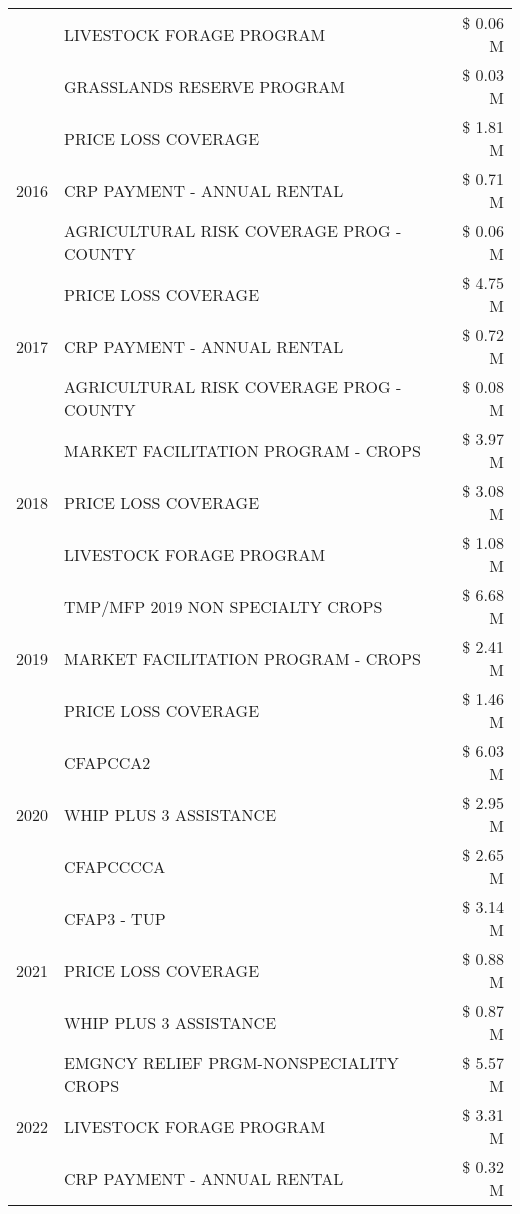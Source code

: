 \begin{tabular}{llr}
 & LIVESTOCK FORAGE PROGRAM & \$ 0.06 M \\
 & GRASSLANDS RESERVE PROGRAM & \$ 0.03 M \\
\cline{1-3}
\multirow[t]{3}{*}{2016} & PRICE LOSS COVERAGE & \$ 1.81 M \\
 & CRP PAYMENT - ANNUAL RENTAL & \$ 0.71 M \\
 & AGRICULTURAL RISK COVERAGE PROG - COUNTY & \$ 0.06 M \\
\cline{1-3}
\multirow[t]{3}{*}{2017} & PRICE LOSS COVERAGE & \$ 4.75 M \\
 & CRP PAYMENT - ANNUAL RENTAL & \$ 0.72 M \\
 & AGRICULTURAL RISK COVERAGE PROG - COUNTY & \$ 0.08 M \\
\cline{1-3}
\multirow[t]{3}{*}{2018} & MARKET FACILITATION PROGRAM - CROPS & \$ 3.97 M \\
 & PRICE LOSS COVERAGE & \$ 3.08 M \\
 & LIVESTOCK FORAGE PROGRAM & \$ 1.08 M \\
\cline{1-3}
\multirow[t]{3}{*}{2019} & TMP/MFP 2019 NON SPECIALTY CROPS & \$ 6.68 M \\
 & MARKET FACILITATION PROGRAM - CROPS & \$ 2.41 M \\
 & PRICE LOSS COVERAGE & \$ 1.46 M \\
\cline{1-3}
\multirow[t]{3}{*}{2020} & CFAPCCA2 & \$ 6.03 M \\
 & WHIP PLUS 3 ASSISTANCE & \$ 2.95 M \\
 & CFAPCCCCA & \$ 2.65 M \\
\cline{1-3}
\multirow[t]{3}{*}{2021} & CFAP3 - TUP & \$ 3.14 M \\
 & PRICE LOSS COVERAGE & \$ 0.88 M \\
 & WHIP PLUS 3 ASSISTANCE & \$ 0.87 M \\
\cline{1-3}
\multirow[t]{3}{*}{2022} & EMGNCY RELIEF PRGM-NONSPECIALITY CROPS & \$ 5.57 M \\
 & LIVESTOCK FORAGE PROGRAM & \$ 3.31 M \\
 & CRP PAYMENT - ANNUAL RENTAL & \$ 0.32 M \\
\cline{1-3}
\bottomrule
\end{tabular}
